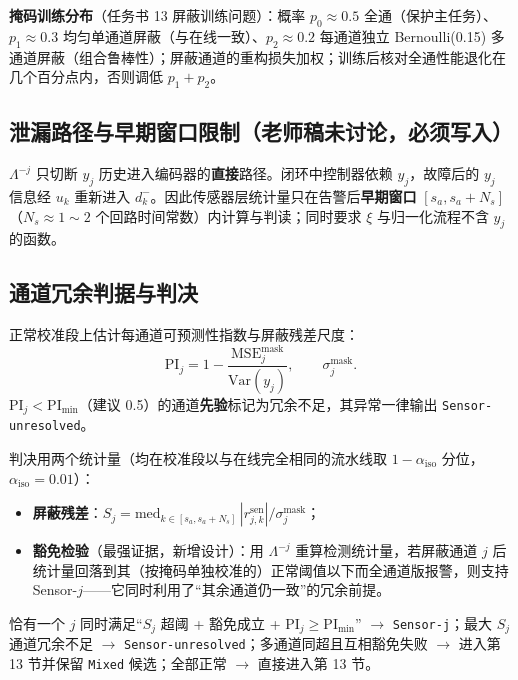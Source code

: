 \documentclass[11pt,a4paper]{ctexart}
\theoremstyle{remark}
\begin{document}
\textbf{掩码训练分布}（任务书 13 屏蔽训练问题）：概率 $p_0\approx0.5$ 全通（保护主任务）、$p_1\approx0.3$ 均匀单通道屏蔽（与在线一致）、$p_2\approx0.2$ 每通道独立 Bernoulli(0.15) 多通道屏蔽（组合鲁棒性）；屏蔽通道的重构损失加权；训练后核对全通性能退化在几个百分点内，否则调低 $p_1+p_2$。

\subsection{泄漏路径与早期窗口限制（老师稿未讨论，必须写入）}

$\Lambda^{-j}$ 只切断 $y_j$ 历史进入编码器的\textbf{直接}路径。闭环中控制器依赖 $y_j$，故障后的 $y_j$ 信息经 $u_k$ 重新进入 $d^-_k$。因此传感器层统计量只在告警后\textbf{早期窗口} $[s_a,s_a+N_s]$（$N_s\approx1\sim2$ 个回路时间常数）内计算与判读；同时要求 $\xi$ 与归一化流程不含 $y_j$ 的函数。

\subsection{通道冗余判据与判决}

正常校准段上估计每通道可预测性指数与屏蔽残差尺度：
\begin{equation}\label{eq:PI}
\mathrm{PI}_j=1-\frac{\mathrm{MSE}^{\mathrm{mask}}_j}{\mathrm{Var}(y_j)},\qquad \sigma^{\mathrm{mask}}_j .
\end{equation}
$\mathrm{PI}_j<\mathrm{PI}_{\min}$（建议 0.5）的通道\textbf{先验}标记为冗余不足，其异常一律输出 \texttt{Sensor-unresolved}。

判决用两个统计量（均在校准段以与在线完全相同的流水线取 $1-\alpha_{\mathrm{iso}}$ 分位，$\alpha_{\mathrm{iso}}=0.01$）：
\begin{itemize}
\item \textbf{屏蔽残差}：$S_j=\mathrm{med}_{k\in[s_a,s_a+N_s]}\,|r^{\mathrm{sen}}_{j,k}|/\sigma^{\mathrm{mask}}_j$；
\item \textbf{豁免检验}（最强证据，新增设计）：用 $\Lambda^{-j}$ 重算检测统计量，若屏蔽通道 $j$ 后统计量回落到其（按掩码单独校准的）正常阈值以下而全通道版报警，则支持 Sensor-$j$——它同时利用了“其余通道仍一致”的冗余前提。
\end{itemize}
恰有一个 $j$ 同时满足“$S_j$ 超阈 + 豁免成立 + $\mathrm{PI}_j\ge\mathrm{PI}_{\min}$” $\to$ \texttt{Sensor-j}；最大 $S_j$ 通道冗余不足 $\to$ \texttt{Sensor-unresolved}；多通道同超且互相豁免失败 $\to$ 进入第 13 节并保留 \texttt{Mixed} 候选；全部正常 $\to$ 直接进入第 13 节。

\end{document}

